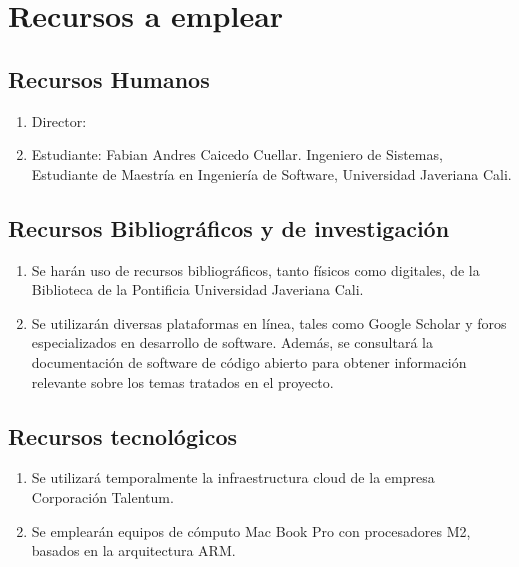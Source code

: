 \section{Recursos a emplear}

\subsection{Recursos Humanos}
\begin{enumerate}
    \item Director: 
    \item Estudiante: Fabian Andres Caicedo Cuellar. Ingeniero de Sistemas, Estudiante de Maestría en Ingeniería de Software, Universidad Javeriana Cali.
\end{enumerate}

\subsection{Recursos Bibliográficos y de investigación}
\begin{enumerate}
    \item Se harán uso de recursos bibliográficos, tanto físicos como digitales, de la Biblioteca de la Pontificia Universidad Javeriana Cali.

    \item Se utilizarán diversas plataformas en línea, tales como Google Scholar y foros especializados en desarrollo de software. Además, se consultará la documentación de software de código abierto para obtener información relevante sobre los temas tratados en el proyecto.
\end{enumerate}

\subsection{Recursos tecnológicos}
\begin{enumerate}
    \item Se utilizará temporalmente la infraestructura cloud de la empresa Corporación Talentum.
    \item Se emplearán equipos de cómputo Mac Book Pro con procesadores M2, basados en la arquitectura ARM.
\end{enumerate}